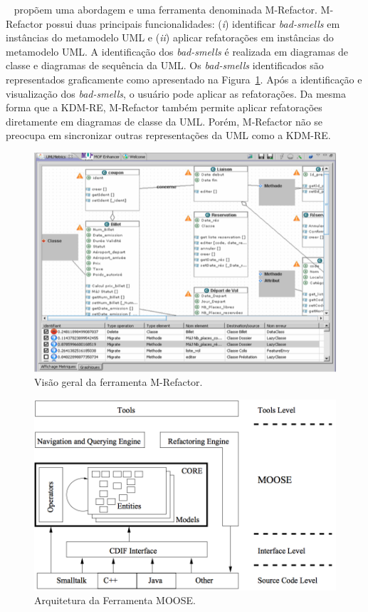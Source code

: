 ~ propõem uma abordagem e uma ferramenta denominada M-Refactor. M-Refactor possui duas principais funcionalidades: (\textit{i}) identificar \textit{bad-smells} em instâncias do metamodelo UML e (\textit{ii}) aplicar refatorações em instâncias do metamodelo UML. A identificação dos \textit{bad-smells} é realizada em diagramas de classe e diagramas de sequência da UML. Os \textit{bad-smells} identificados são representados graficamente como apresentado na Figura~\ref{fig:m_refactor}. Após a identificação e visualização dos \textit{bad-smells}, o usuário pode aplicar as refatorações. Da mesma forma que a KDM-RE, M-Refactor também permite aplicar refatorações diretamente em diagramas de classe da UML. Porém, M-Refactor não se preocupa em sincronizar outras representações da UML como a KDM-RE.

\begin{figure}[h]
	\centering
	\caption{Visão geral da ferramenta M-Refactor.}
	\label{fig:m_refactor}
	\includegraphics[scale=0.6]{images/m_refactor}
\end{figure}

\begin{figure}[h]
	\centering
	\caption{Arquitetura da Ferramenta MOOSE.}
	\label{fig:moose}
	\includegraphics[scale=0.32]{images/MOOSEArchitecture}
\end{figure}


